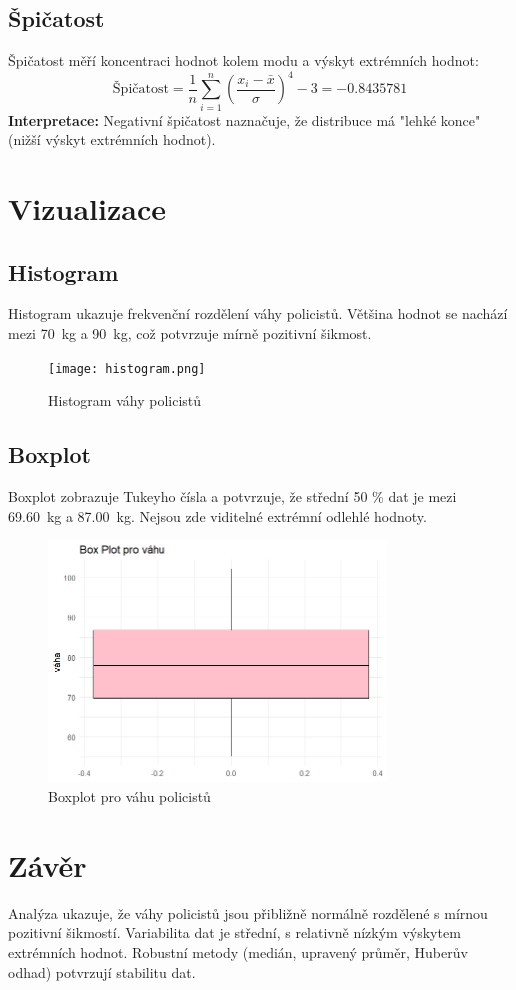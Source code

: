 \documentclass{article}
\begin{document}
\subsection{Špičatost}
Špičatost měří koncentraci hodnot kolem modu a výskyt extrémních hodnot:
\[
\text{Špičatost} = \frac{1}{n} \sum_{i=1}^{n} \left( \frac{x_i - \bar{x}}{\sigma} \right)^4 - 3 = -0.8435781
\]
\textbf{Interpretace:} Negativní špičatost naznačuje, že distribuce má "lehké konce" (nižší výskyt extrémních hodnot).

\section{Vizualizace}

\subsection{Histogram}
Histogram ukazuje frekvenční rozdělení váhy policistů. 
Většina hodnot se nachází mezi \SI{70}{\kilo\gram} a \SI{90}{\kilo\gram}, což potvrzuje mírně pozitivní šikmost.

\begin{figure}[H]
    \centering
    \texttt{[image: histogram.png]}
    \caption{Histogram váhy policistů}
    \label{fig:histogram}
\end{figure}

\subsection{Boxplot}
Boxplot zobrazuje Tukeyho čísla a potvrzuje, že střední 50 \% dat je mezi \SI{69.60}{\kilo\gram} a \SI{87.00}{\kilo\gram}. Nejsou zde viditelné extrémní odlehlé hodnoty.

\begin{figure}[H]
    \centering
    \includegraphics[width=0.8\textwidth]{boxplot.png}
    \caption{Boxplot pro váhu policistů}
    \label{fig:boxplot}
\end{figure}

\section{Závěr}
Analýza ukazuje, že váhy policistů jsou přibližně normálně rozdělené s mírnou pozitivní šikmostí. Variabilita dat je střední, s relativně nízkým výskytem extrémních hodnot. Robustní metody (medián, upravený průměr, Huberův odhad) potvrzují stabilitu dat.
\end{document}
